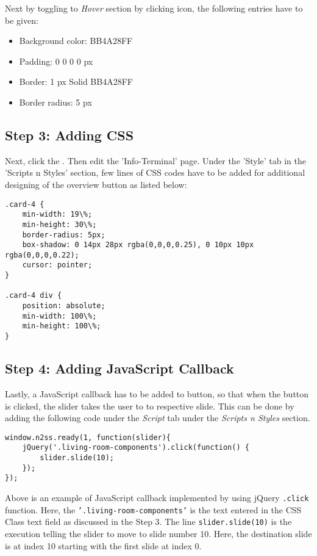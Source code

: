 Next by toggling to \emph{Hover} section by clicking  icon, the following entries have to be given:
\begin{itemize}
\item Background color: BB4A28FF
\item Padding: 0 0 0 0 px
\item Border: 1 px Solid BB4A28FF
\item Border radius: 5 px
\end{itemize}

\subsection*{Step 3: Adding CSS}
Next, click the . Then edit the 'Info-Terminal' page. Under the 'Style' tab in the 'Scripts n Styles' section, few lines of CSS codes have to be added for additional designing of the overview button as listed below:
\begin{lstlisting}
.card-4 {
	min-width: 19\%;
	min-height: 30\%;
	border-radius: 5px;
	box-shadow: 0 14px 28px rgba(0,0,0,0.25), 0 10px 10px rgba(0,0,0,0.22);
	cursor: pointer;
}

.card-4 div {
	position: absolute;
	min-width: 100\%;
	min-height: 100\%;
}
\end{lstlisting}

\subsection*{Step 4: Adding JavaScript Callback}
Lastly, a JavaScript callback has to be added to button, so that when the button is clicked, the slider takes the user to to respective slide. This can be done by adding the following code under the \emph{Script} tab under the \emph{Scripts n Styles} section.

\begin{lstlisting}
window.n2ss.ready(1, function(slider){
	jQuery('.living-room-components').click(function() {
		slider.slide(10);
	});
});
\end{lstlisting}

Above is an example of JavaScript callback implemented by using jQuery \texttt{.click} function. Here, the \texttt{'.living-room-components'} is the text entered in the CSS Class text field as discussed in the Step 3. The line \texttt{slider.slide(10)} is the execution telling the slider to move to slide number 10. Here, the destination slide is at index 10 starting with the first slide at index 0.

